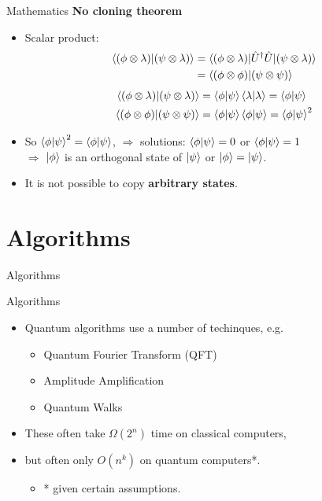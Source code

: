 \documentclass{beamer}
\newcommand{\chapterframe}[1]{\begin{frame}\centering\huge{#1}\end{frame}}
\begin{document}
\begin{frame}{Mathematics}
\textbf{No cloning theorem}
	\begin{itemize}
		\item Scalar product:
            \begin{align}\begin{split}
\braket{(\phi\otimes\lambda)|(\psi\otimes\lambda)} & = \braket{(\phi\otimes\lambda)|\hat{U}^{\dagger}\hat{U}|(\psi\otimes\lambda)} \\
& = \braket{(\phi\otimes\phi)|(\psi\otimes\psi)}
			\end{split}\end{align}
            \begin{align}\begin{split}
\braket{(\phi\otimes\lambda)|(\psi\otimes\lambda)} & = \braket{\phi|\psi}\braket{\lambda|\lambda} = \braket{\phi|\psi} \\
\braket{(\phi\otimes\phi)|(\psi\otimes\psi)} & = \braket{\phi|\psi} \braket{\phi|\psi} = \braket{\phi|\psi}^2
            \end{split}\end{align}
        \item So $\braket{\phi|\psi}^2 = \braket{\phi|\psi}$, $\Rightarrow$ solutions: $\braket{\phi|\psi} = 0$ or $\braket{\phi|\psi} = 1$ \\ $\Rightarrow$ $\ket{\phi}$ is an orthogonal state of $\ket{\psi}$ or $\ket{\phi} = \ket{\psi}$.
        \item It is not possible to copy \textbf{arbitrary states}. 
	\end{itemize}
\end{frame}

\section{Algorithms}
\chapterframe{Algorithms}

\begin{frame}{Algorithms}
	\begin{itemize}
		\item Quantum algorithms use a number of techinques, e.g.
			\begin{itemize}
				\item Quantum Fourier Transform (QFT)
				\item Amplitude Amplification
				\item Quantum Walks
			\end{itemize}
		\item These often take $\Omega(2^n)$ time on classical computers,
		\item but often only $O(n^k)$ on quantum computers*.
			\begin{itemize}
				\item * given certain assumptions.
			\end{itemize}
	\end{itemize}
\end{frame}
\end{document}
